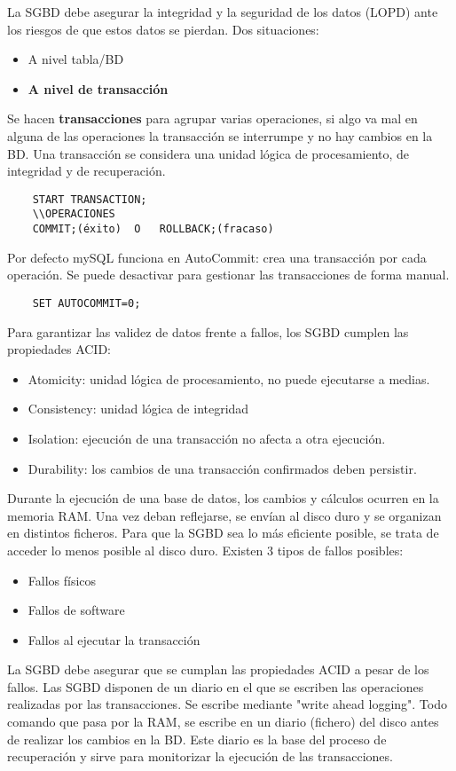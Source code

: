 \documentclass{article}
\begin{document}
La SGBD debe asegurar la integridad y la seguridad de los datos (LOPD) ante los riesgos de que estos datos se pierdan. 
Dos situaciones:
\begin{itemize}
	\item A nivel tabla/BD
	\item \textbf{A nivel de transacción}
\end{itemize}

Se hacen \textbf{transacciones} para agrupar varias operaciones, si algo va mal en alguna de las operaciones la transacción se interrumpe y no hay cambios en la BD. 
Una transacción se considera una unidad lógica de procesamiento, de integridad y de recuperación. 
\begin{verbatim}
	START TRANSACTION;
	\\OPERACIONES
	COMMIT;(éxito)	O 	ROLLBACK;(fracaso)
\end{verbatim}
Por defecto mySQL funciona en AutoCommit: crea una transacción por cada operación. Se puede desactivar para gestionar las transacciones de forma manual.
\begin{verbatim}
	SET AUTOCOMMIT=0;
\end{verbatim}
Para garantizar las validez de datos frente a fallos, los SGBD cumplen las propiedades ACID:
\begin{itemize}
	\item Atomicity: unidad lógica de procesamiento, no puede ejecutarse a medias.
	\item Consistency: unidad lógica de integridad
	\item Isolation: ejecución de una transacción no afecta a otra ejecución.
	\item Durability: los cambios de una transacción confirmados deben persistir.
\end{itemize}
Durante la ejecución de una base de datos, los cambios y cálculos ocurren en la memoria RAM. Una vez deban reflejarse, se envían al disco duro y se organizan en distintos ficheros. Para que la SGBD sea lo más eficiente posible, se trata de acceder lo menos posible al disco duro. 
Existen 3 tipos de fallos posibles:
\begin{itemize}
	\item Fallos físicos
	\item Fallos de software
	\item Fallos al ejecutar la transacción
\end{itemize}
La SGBD debe asegurar que se cumplan las propiedades ACID a pesar de los fallos. 
Las SGBD disponen de un diario en el que se escriben las operaciones realizadas por las transacciones. Se escribe mediante "write ahead logging". Todo comando que pasa por la RAM, se escribe en un diario (fichero) del disco antes de realizar los cambios en la BD. Este diario es la base del proceso de recuperación y sirve para monitorizar la ejecución de las transacciones. 
\end{document}
